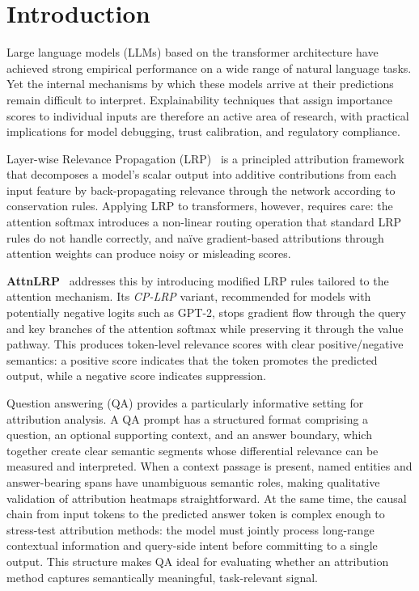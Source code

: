 \documentclass[10pt,twocolumn,letterpaper]{article}
\begin{document}
\section{Introduction}
\label{sec:intro}

Large language models (LLMs) based on the transformer architecture have
achieved strong empirical performance on a wide range of natural language tasks.
Yet the internal mechanisms by which these models arrive at their predictions
remain difficult to interpret.
Explainability techniques that assign importance scores to individual inputs
are therefore an active area of research, with practical implications for model
debugging, trust calibration, and regulatory compliance.

Layer-wise Relevance Propagation (LRP)~\cite{bach2015pixel} is a principled
attribution framework that decomposes a model's scalar output into additive
contributions from each input feature by back-propagating relevance through
the network according to conservation rules.
Applying LRP to transformers, however, requires care: the attention softmax
introduces a non-linear routing operation that standard LRP rules do not handle
correctly, and na\"ive gradient-based attributions through attention weights can
produce noisy or misleading scores.

\textbf{AttnLRP}~\cite{achtibat2024attnlrp} addresses this by introducing
modified LRP rules tailored to the attention mechanism.
Its \emph{CP-LRP} variant, recommended for models with potentially negative
logits such as GPT-2, stops gradient flow through the query and key branches
of the attention softmax while preserving it through the value pathway.
This produces token-level relevance scores with clear positive/negative
semantics: a positive score indicates that the token promotes the predicted
output, while a negative score indicates suppression.

Question answering (QA) provides a particularly informative setting for
attribution analysis.
A QA prompt has a structured format comprising a question, an
optional supporting context, and an answer boundary, which together create clear
semantic segments whose differential relevance can be measured and
interpreted.
When a context passage is present, named entities and answer-bearing spans
have unambiguous semantic roles, making qualitative validation of attribution
heatmaps straightforward.
At the same time, the causal chain from input tokens to the predicted answer
token is complex enough to stress-test attribution methods: the model must
jointly process long-range contextual information and query-side intent before
committing to a single output.
This structure makes QA ideal for evaluating whether an attribution method
captures semantically meaningful, task-relevant signal.
\end{document}
